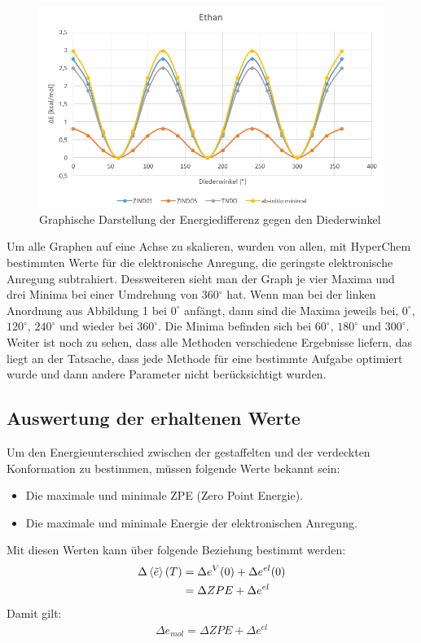 \begin{figure}[H]
    \centering
    \includegraphics[scale=.7]{../src/img/ethan1.png}
    \caption{Graphische Darstellung der Energiedifferenz gegen den Diederwinkel}
\end{figure}

Um alle Graphen auf eine Achse zu skalieren, wurden von allen, mit HyperChem bestimmten Werte für die elektronische Anregung, die geringste
elektronische Anregung subtrahiert. Dessweiteren sieht man der Graph je vier Maxima und drei Minima bei einer Umdrehung von 360$^\circ$ hat.
Wenn man bei der linken Anordnung aus Abbildung 1 bei $0^\circ$ anfängt, dann sind die Maxima jeweils bei, $0^\circ$, $120^\circ$, $240^\circ$
und wieder bei $360^\circ$. Die Minima befinden sich bei $60^\circ$, $180^\circ$ und $300^\circ$.\\
Weiter ist noch zu sehen, dass alle Methoden verschiedene Ergebnisse liefern, das liegt an der Tatsache, dass jede Methode für eine bestimmte
Aufgabe optimiert wurde und dann andere Parameter nicht berücksichtigt wurden.

\subsection{Auswertung der erhaltenen Werte}
Um den Energieunterschied zwischen der gestaffelten und der verdeckten Konformation zu bestimmen, müssen folgende Werte bekannt sein:
\begin{itemize}
    \item Die maximale und minimale ZPE (Zero Point Energie).
    \item Die maximale und minimale Energie der elektronischen Anregung.
\end{itemize}
Mit diesen Werten kann über folgende Beziehung bestimmt werden:
\begin{align*}
    \Delta \braket{\tilde{e}}(T) &= \Delta e^V (0) + \Delta e^{el} (0) \\
                                 &= \Delta ZPE + \Delta e^{el}   
\end{align*} 
Damit gilt:
\begin{align}
    \Delta e_{mol} = \Delta ZPE + \Delta e^{el} 
\end{align}


